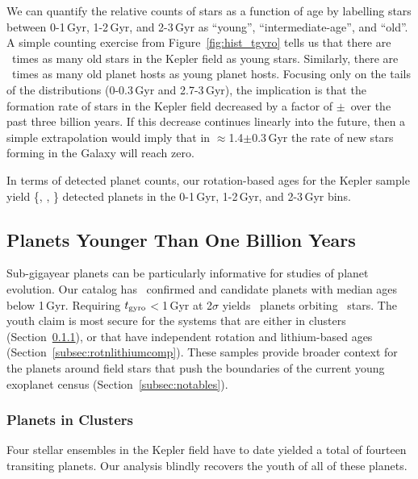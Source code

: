 \documentclass[11pt,twocolumn,tighten,linenumbers,trackchanges]{aastex63}
\begin{document}
We can quantify the relative counts of stars as a function of age by
labelling stars between 0-1\,Gyr, 1-2\,Gyr, and 2-3\,Gyr as ``young'',
``intermediate-age'', and ``old''.  A simple counting exercise from
Figure~\ref{fig:hist_tgyro} tells us that there are
\ratioobtoybstars\ times as many old stars in the Kepler field as young stars.
Similarly, there are \ratioobtoybplanets\ times as many old planet
hosts as young planet hosts.  Focusing only on the tails of the
distributions (0-0.3\,Gyr and 2.7-3\,Gyr), the implication is that the
formation rate of stars in the Kepler field decreased by a factor of
\ratiosfr$\pm$\uncratiosfr\ over the past three billion years.  If
this decrease continues linearly into the future, then a simple
extrapolation would imply that in $\approx$1.4$\pm$0.3\,Gyr the rate
of new stars forming in the Galaxy will reach zero.

In terms of detected planet counts, our rotation-based ages for the
Kepler sample yield \{\nplyounggyro, \nplmidgyro, \nploldgyro\}
detected planets in the 0-1\,Gyr, 1-2\,Gyr, and 2-3\,Gyr bins.  


\subsection{Planets Younger Than One Billion Years}

Sub-gigayear planets can be particularly informative for studies of
planet evolution.  Our catalog has \nplyounggyro\ confirmed and
candidate planets with median ages below 1\,Gyr.  Requiring $t_{\rm
gyro}$$<$1\,Gyr at 2$\sigma$ yields \nplyounggyrotwosigma\ planets
orbiting \nplhostsyounggyrotwosigma\ stars.  The youth claim is most
secure for the systems that are either in clusters (Section~\ref{subsec:clusterplanets}), or that have
independent rotation and lithium-based ages (Section~\ref{subsec:rotnlithiumcomp}).
These samples provide broader context for the planets around field
stars that push the boundaries of the current young exoplanet census
(Section~\ref{subsec:notables}).

\subsubsection{Planets in Clusters}
\label{subsec:clusterplanets}

Four stellar ensembles in the Kepler field have to date yielded a
total of fourteen transiting planets.  Our analysis blindly recovers
the youth of all of these planets.
\end{document}
